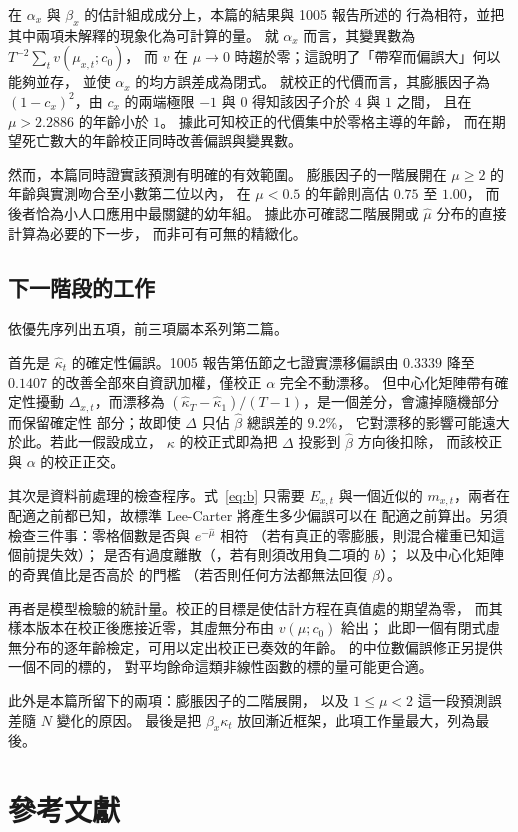 \documentclass[UTF8, fontset=macnew, a4paper, 12pt]{ctexart}
\begin{document}
在 $\alpha_x$ 與 $\beta_x$ 的估計組成成分上，本篇的結果與 1005 報告所述的
行為相符，並把其中兩項未解釋的現象化為可計算的量。
就 $\alpha_x$ 而言，其變異數為 $T^{-2}\sum_t v(\mu_{x,t};c_0)$，
而 $v$ 在 $\mu\to0$ 時趨於零；這說明了「帶窄而偏誤大」何以能夠並存，
並使 $\alpha_x$ 的均方誤差成為閉式。
就校正的代價而言，其膨脹因子為 $(1-c_x)^2$，由 $c_x$ 的兩端極限
$-1$ 與 $0$ 得知該因子介於 $4$ 與 $1$ 之間，
且在 $\mu>2.2886$ 的年齡小於 $1$。
據此可知校正的代價集中於零格主導的年齡，
而在期望死亡數大的年齡校正同時改善偏誤與變異數。

然而，本篇同時證實該預測有明確的有效範圍。
膨脹因子的一階展開在 $\mu\ge2$ 的年齡與實測吻合至小數第二位以內，
在 $\mu<0.5$ 的年齡則高估 $0.75$ 至 $1.00$，
而後者恰為小人口應用中最關鍵的幼年組。
據此亦可確認二階展開或 $\hat\mu$ 分布的直接計算為必要的下一步，
而非可有可無的精緻化。

\subsection{下一階段的工作}

依優先序列出五項，前三項屬本系列第二篇。

首先是 $\hat\kappa_t$ 的確定性偏誤。1005 報告第伍節之七證實漂移偏誤由
$0.3339$ 降至 $0.1407$ 的改善全部來自資訊加權，僅校正 $\alpha$ 完全不動漂移。
但中心化矩陣帶有確定性擾動 $\Delta_{x,t}$，而漂移為
$(\hat\kappa_T-\hat\kappa_1)/(T-1)$，是一個差分，會濾掉隨機部分而保留確定性
部分；故即使 $\Delta$ 只佔 $\hat\beta$ 總誤差的 $9.2\%$，
它對漂移的影響可能遠大於此。若此一假設成立，
$\kappa$ 的校正式即為把 $\Delta$ 投影到 $\hat\beta$ 方向後扣除，
而該校正與 $\alpha$ 的校正正交。

其次是資料前處理的檢查程序。式~\eqref{eq:b} 只需要 $E_{x,t}$ 與一個近似的
$m_{x,t}$，兩者在配適之前都已知，故標準 Lee-Carter 將產生多少偏誤可以在
配適之前算出。另須檢查三件事：零格個數是否與 $e^{-\hat\mu}$ 相符
（若有真正的零膨脹，則混合權重已知這個前提失效）；
是否有過度離散（\citealp{djeundje2010}，若有則須改用負二項的 $b$）；
以及中心化矩陣的奇異值比是否高於 \citet{benaych2012} 的門檻
（若否則任何方法都無法回復 $\beta$）。

再者是模型檢驗的統計量。校正的目標是使估計方程在真值處的期望為零，
而其樣本版本在校正後應接近零，其虛無分布由 $v(\mu;c_0)$ 給出；
此即一個有閉式虛無分布的逐年齡檢定，可用以定出校正已奏效的年齡。
\citet{kennepagui2017} 的中位數偏誤修正另提供一個不同的標的，
對平均餘命這類非線性函數的標的量可能更合適。

此外是本篇所留下的兩項：膨脹因子的二階展開，
以及 $1\le\mu<2$ 這一段預測誤差隨 $N$ 變化的原因。
最後是把 $\beta_x\kappa_t$ 放回漸近框架，此項工作量最大，列為最後。

\section*{參考文獻}

\renewcommand{\bibsection}{}
\setlength{\bibsep}{2pt}


\end{document}
